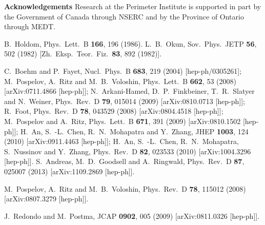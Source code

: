 \documentclass[12pt]{article}
\begin{document}
{\bf Acknowledgements}  Research at the 
Perimeter Institute is supported in part by the Government of Canada through 
NSERC and by the Province of Ontario through MEDT. 




\begin{thebibliography}{99}

  B.~Holdom,
  Phys.\ Lett.\ B {\bf 166}, 196 (1986).   %
  L.~B.~Okun,
  Sov.\ Phys.\ JETP {\bf 56}, 502 (1982)
  [Zh.\ Eksp.\ Teor.\ Fiz.\  {\bf 83}, 892 (1982)].

  C.~Boehm and P.~Fayet,
  Nucl.\ Phys.\ B {\bf 683}, 219 (2004)
  [hep-ph/0305261]; M.~Pospelov, A.~Ritz and M.~B.~Voloshin,
  Phys.\ Lett.\ B {\bf 662}, 53 (2008)
  [arXiv:0711.4866 [hep-ph]];
  N.~Arkani-Hamed, D.~P.~Finkbeiner, T.~R.~Slatyer and N.~Weiner,
  Phys.\ Rev.\ D {\bf 79}, 015014 (2009)
  [arXiv:0810.0713 [hep-ph]];
  R.~Foot,
  Phys.\ Rev.\ D {\bf 78}, 043529 (2008)
  [arXiv:0804.4518 [hep-ph]];
M.~Pospelov and A.~Ritz,
  Phys.\ Lett.\ B {\bf 671}, 391 (2009)
  [arXiv:0810.1502 [hep-ph]];
  H.~An, S.~-L.~Chen, R.~N.~Mohapatra and Y.~Zhang,
  JHEP {\bf 1003}, 124 (2010)
  [arXiv:0911.4463 [hep-ph]];
  H.~An, S.~-L.~Chen, R.~N.~Mohapatra, S.~Nussinov and Y.~Zhang,
  Phys.\ Rev.\ D {\bf 82}, 023533 (2010)
  [arXiv:1004.3296 [hep-ph]].
S.~Andreas, M.~D.~Goodsell and A.~Ringwald,
  Phys.\ Rev.\ D {\bf 87}, 025007 (2013)
  [arXiv:1109.2869 [hep-ph]].

  M.~Pospelov, A.~Ritz and M.~B.~Voloshin,
  Phys.\ Rev.\ D {\bf 78}, 115012 (2008)
  [arXiv:0807.3279 [hep-ph]].

 J.~Redondo and M.~Postma,
  JCAP {\bf 0902}, 005 (2009)
  [arXiv:0811.0326 [hep-ph]].



\end{thebibliography}
\end{document}
